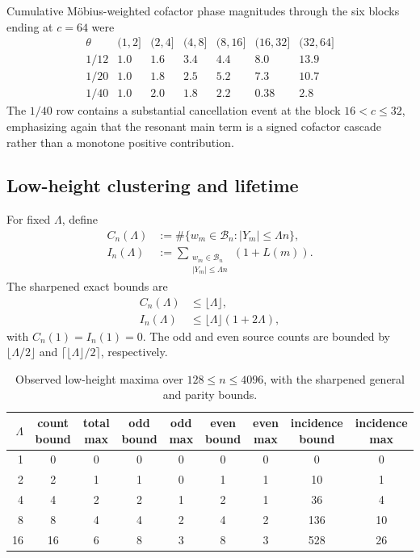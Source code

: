 \documentclass[11pt]{article}
\theoremstyle{definition}
\newcommand{\1}{\mathbf{1}}
\begin{document}
Cumulative M\"obius-weighted cofactor phase magnitudes through the six blocks ending at $c=64$ were
\begin{equation}
\begin{array}{c|rrrrrr}
\theta & (1,2]&(2,4]&(4,8]&(8,16]&(16,32]&(32,64]\\
\hline
1/12 & 1.0&1.6&3.4&4.4&8.0&13.9\\
1/20 & 1.0&1.8&2.5&5.2&7.3&10.7\\
1/40 & 1.0&2.0&1.8&2.2&0.38&2.8
\end{array}
\label{eq:extended-cofactor-phase-cascade}
\end{equation}
The $1/40$ row contains a substantial cancellation event at the block $16<c\le32$, emphasizing again that the resonant main term is a signed cofactor cascade rather than a monotone positive contribution.

\subsection{Low-height clustering and lifetime}

For fixed $\Lambda$, define
\begin{align}
 C_n(\Lambda)
 &:={\#}\{w_m\in\mathscr B_n:|Y_m|\le\Lambda n\},
 \label{eq:C-lambda}\\
 I_n(\Lambda)
 &:={\sum}_{\substack{w_m\in\mathscr B_n\\|Y_m|\le\Lambda n}}
 (1+L(m)).
 \label{eq:I-lambda}
\end{align}
The sharpened exact bounds are
\begin{align}
 C_n(\Lambda)&\le\lfloor\Lambda\rfloor,
 \label{eq:C-pass}\\
 I_n(\Lambda)&\le\lfloor\Lambda\rfloor(1+2\Lambda),
 \label{eq:I-pass}
\end{align}
with $C_n(1)=I_n(1)=0$.  The odd and even source counts are bounded by $\lfloor\Lambda/2\rfloor$ and $\lceil\lfloor\Lambda\rfloor/2\rceil$, respectively.

\begin{table}[htbp]
\centering
\caption{Observed low-height maxima over $128\le n\le4096$, with the sharpened general and parity bounds.}
\label{tab:low-height-numerical}
\scriptsize
\setlength{\tabcolsep}{3.5pt}
\begin{tabular}{rcccccccc}
\toprule
$\Lambda$ &
count bound & total max &
odd bound & odd max &
even bound & even max &
incidence bound & incidence max\\
\midrule
1  & 0  & 0 & 0 & 0 & 0 & 0 & 0   & 0\\
2  & 2  & 1 & 1 & 0 & 1 & 1 & 10  & 1\\
4  & 4  & 2 & 2 & 1 & 2 & 1 & 36  & 4\\
8  & 8  & 4 & 4 & 2 & 4 & 2 & 136 & 10\\
16 & 16 & 6 & 8 & 3 & 8 & 3 & 528 & 26\\
\bottomrule
\end{tabular}
\end{table}
\end{document}
